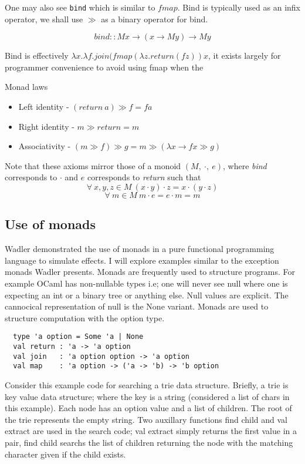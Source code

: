 \documentclass[a4paper,10pt]{article}
\theoremstyle{definition}
\begin{document}
One may also see \texttt{bind} which is similar to $fmap$.
Bind is typically used as an infix operator, we shall use $\gg$ as a binary
operator for bind.

\begin{equation}
  bind :: M x \rightarrow (x \rightarrow M y) \rightarrow M y
\end{equation}

Bind is effectively $\lambda x. \lambda f.join (fmap (\lambda z. return (f z)) x$,
it exists largely for programmer convenience to avoid using fmap when the

Monad laws
\begin{itemize}
	\item Left identity - $(return\ a) \gg f = f a$
	\item Right identity - $m \gg return = m$
	\item Associativity - $(m \gg f) \gg g = m \gg (\lambda x \rightarrow f x \gg g)$
\end{itemize}

Note that these axioms mirror those of a monoid $(M,\ \cdot,\ e)$,
where \textit{bind} corresponds to $\cdot$ and
$e$ corresponds to \textit{return} such that
$$\forall\ x, y, z \in M\ (x \cdot y) \cdot z = x \cdot (y \cdot z)$$
$$\forall\ m \in M\ m \cdot e = e \cdot m = m$$

\subsection{Use of monads}
Wadler \cite{wadler1990comprehending} demonstrated the use of monads in a pure
functional programming language to simulate effects. I will explore examples similar to
the exception monads Wadler presents. Monads are frequently used
to structure programs. For example OCaml has non-nullable types
i.e; one will never see null where one is expecting an
int or a binary tree or anything else.
Null values are explicit. The cannocical representation of null is the None variant.
Monads are used to structure computation with the option type.

\begin{verbatim}
  type 'a option = Some 'a | None
  val return : 'a -> 'a option
  val join   : 'a option option -> 'a option
  val map    : 'a option -> ('a -> 'b) -> 'b option
\end{verbatim}

Consider this example code for searching a trie data structure. Briefly,
a trie is key value data structure; where the key is a string (considered a
list of chars in this example). Each node has an option value and a list of
children. The root of the trie represents the empty string. Two auxillary
functions find child and val extract are used in the search code;
val extract simply returns the first value in a pair, find child searchs
the list of children returning the node with the matching character given
if the child exists.
\end{document}
